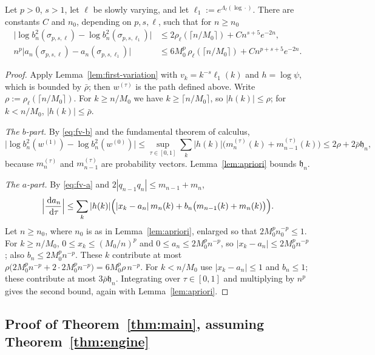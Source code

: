 \begin{proposition}\label{prop:stability}
Let $p>0$, $s>1$, let $\ell$ be slowly varying, and let $\ell_1:=e^{\Lambda_\ell(\log\cdot)}$. There are constants $C$ and
$n_0$, depending on $p,s,\ell$, such that for $n\ge n_0$
\begin{align*}
  \bigl|\log b_n^2(\sigma_{p,s,\ell})-\log b_n^2(\sigma_{p,s,\ell_1})\bigr|
    &\le2\rho_\ell(\lceil n/M_0\rceil)+Cn^{s+5}e^{-2n},\\
  n^p\bigl|a_n(\sigma_{p,s,\ell})-a_n(\sigma_{p,s,\ell_1})\bigr|
    &\le6M_0^p\,\rho_\ell(\lceil n/M_0\rceil)+Cn^{p+s+5}e^{-2n}.
\end{align*}
\end{proposition}

\begin{proof}
Apply Lemma~\ref{lem:first-variation} with $v_k=k^{-s}\ell_1(k)$ and $h=\log\psi$, which is bounded by $\bar\rho$; then
$w^{(\tau)}$ is the path defined above. Write $\rho:=\rho_\ell(\lceil n/M_0\rceil)$. For $k\ge n/M_0$ we have
$k\ge\lceil n/M_0\rceil$, so $|h(k)|\le\rho$; for $k<n/M_0$, $|h(k)|\le\bar\rho$.

\emph{The $b$-part.} By \eqref{eq:fv-b} and the fundamental theorem of calculus,
\[
  \bigl|\log b_n^2(w^{(1)})-\log b_n^2(w^{(0)})\bigr|\le\sup_{\tau\in[0,1]}\sum_k|h(k)|\bigl(m^{(\tau)}_n(k)+m^{(\tau)}_{n-1}(k)\bigr)
  \le2\rho+2\bar\rho\mathfrak h_n,
\]
because $m^{(\tau)}_n$ and $m^{(\tau)}_{n-1}$ are probability vectors. Lemma~\ref{lem:apriori} bounds $\mathfrak h_n$.

\emph{The $a$-part.} By \eqref{eq:fv-a} and $2|q_{n-1}q_n|\le m_{n-1}+m_n$,
\[
  \Bigl|\frac{\,\mathrm{d} a_n}{\,\mathrm{d}\tau}\Bigr|\le\sum_k|h(k)|\Bigl(|x_k-a_n|\,m_n(k)+b_n\bigl(m_{n-1}(k)+m_n(k)\bigr)\Bigr).
\]
Let $n\ge n_0$, where $n_0$ is as in Lemma~\ref{lem:apriori}, enlarged so that $2M_0^pn_0^{-p}\le1$. For $k\ge n/M_0$, $0\le x_k\le(M_0/n)^p$ and $0\le a_n\le2M_0^pn^{-p}$,
so $|x_k-a_n|\le2M_0^pn^{-p}$; also $b_n\le2M_0^pn^{-p}$. These $k$ contribute at most
$\rho\bigl(2M_0^pn^{-p}+2\cdot2M_0^pn^{-p}\bigr)=6M_0^p\rho\,n^{-p}$. For $k<n/M_0$ use $|x_k-a_n|\le1$ and
$b_n\le1$; these contribute at most $3\bar\rho\mathfrak h_n$. Integrating over $\tau\in[0,1]$ and
multiplying by $n^p$ gives the second bound, again with Lemma~\ref{lem:apriori}.
\end{proof}


\subsection{\texorpdfstring{Proof of Theorem~\ref{thm:main}, assuming Theorem~\ref{thm:engine}}{Proof of Theorem 1, assuming Theorem 3}}\label{sec:assembly}

